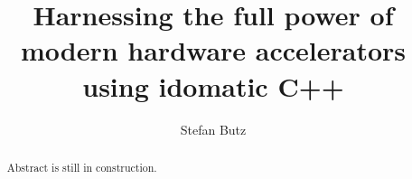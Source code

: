 \documentclass[manuscript,nonacm]{acmart}
\title{Harnessing the full power of modern hardware accelerators using idomatic C++}
\author{Stefan Butz}
\affiliation{%
    \institution{University of Hagen}
    \city{Hagen}
    \country{Germany}
}
\begin{document}
\begin{abstract}
Abstract is still in construction.
\end{abstract}


\maketitle











 
\end{document}
